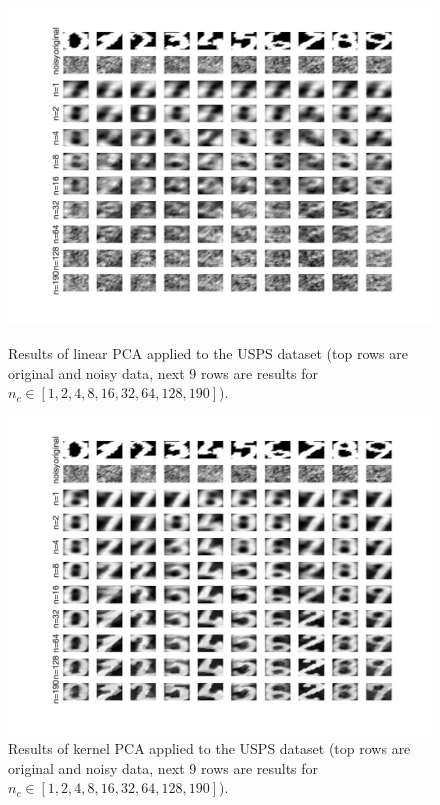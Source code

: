 \begin{figure}[h]
    \centering
    \begin{minipage}{0.45\textwidth}
        \centering
        \includegraphics[width=1\textwidth]{../src/figures/usps/linear_pca}
        \caption{Results of linear PCA applied to the USPS dataset (top rows are original and noisy data, next 9 rows are results for $n_c\in [1,2,4,8,16,32,64,128,190]$).}
\label{usps_linear}
    \end{minipage}\hfill
    \begin{minipage}{0.45\textwidth}
        \centering
        \includegraphics[width=1\textwidth]{../src/figures/usps/kernel_pca}
        \caption{Results of kernel PCA applied to the USPS dataset (top rows are original and noisy data, next 9 rows are results for $n_c\in [1,2,4,8,16,32,64,128,190]$).}
\label{usps_kernel}
    \end{minipage}
\end{figure}

